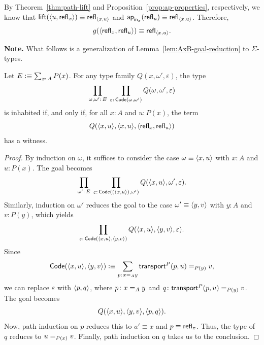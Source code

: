 \begin{rem}
    By Theorem~\ref{thm:path-lift} and Proposition~\ref{prop:ap-properties}, respectively, we know that $\mathsf{lift}(\langle u,\mathsf{refl}_x\rangle)\equiv\mathsf{refl}_{\langle x,u\rangle}$ and $\mathsf{ap}_{\mathsf{in}_x}(\mathsf{refl}_u)\equiv\mathsf{refl}_{\langle x,u\rangle}$. Therefore,
    \begin{equation}\label{eq:Sigma-trivial-decoding}
        g(\langle\mathsf{refl}_x,\mathsf{refl}_u\rangle)
            \equiv\mathsf{refl}_{\langle x,u\rangle}.
    \end{equation}
\end{rem}

\textbf{Note.} What follows is a generalization of Lemma~\ref{lem:AxB-goal-reduction} to $\Sigma$-types.

\begin{lem}\label{lem:Sigma-goal-reduction}
    Let\/ $E\defeq\sum_{x\colon A}P(x)$. For any type family\/ $Q(x,\omega',\varepsilon)$, the type
    \[
        \prod_{\omega,\omega'\colon E}\;
        \prod_{\varepsilon\colon\fun{Code}(\omega,\omega')}
        Q(\omega,\omega',\varepsilon)
    \]
    is inhabited if, and only if, for all\/ $x\colon A$ and\/ $u\colon P(x)$, the term
    \[
        Q(\langle x,u\rangle,\langle x,u\rangle,\langle\mathsf{refl}_x,\mathsf{refl}_u\rangle)
    \]
    has a witness.
\end{lem}

\begin{proof}
    By induction on $\omega$, it suffices to consider the case $\omega\equiv\langle x,u\rangle$ with $x\colon A$ and $u\colon P(x)$. The goal becomes
    \[
        \prod_{\omega'\colon E}\;
        \prod_{\varepsilon\colon\fun{Code}((\dep{x,u}),\omega')}
        Q(\dep{x,u},\omega',\varepsilon).
    \]
    Similarly, induction on $\omega'$ reduces the goal to the case $\omega'\equiv\langle y,v\rangle$ with $y\colon A$ and $v\colon P(y)$, which yields
    \[
        \prod_{\varepsilon\colon\fun{Code}(\dep{x,u},\dep{y,v})}
        Q(\dep{x,u},\dep{y,v},\varepsilon).
    \]
    Since
    \[
        \fun{Code}(\dep{x,u},\dep{y,v})
            \defeq\sum_{p\colon x\eq Ay}
        \fun{transport}^P(p,u) \eq{P(y)}v,
    \]
    we can replace $\varepsilon$ with $\langle p,q\rangle$, where $p\colon x\eq Ay$ and $q\colon\fun{transport}^P(p,u)\eq{P(y)}v$. The goal becomes
    \[
        Q(\langle x,u\rangle,\langle y,v\rangle,\langle p,q\rangle).
    \]
    Now, path induction on $p$ reduces this to $a'\equiv x$ and $p\equiv\mathsf{refl}_x$. Thus, the type of $q$ reduces to $u\mathrel{=_{P(x)}}v$. Finally, path induction on $q$ takes us to the conclusion.
\end{proof}

